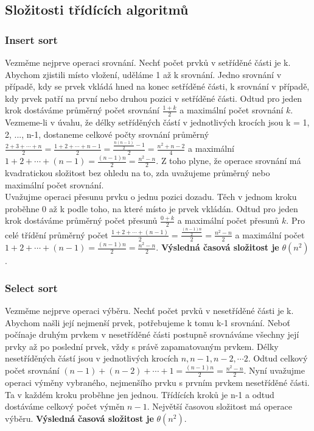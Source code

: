 \documentclass[10pt,a4paper]{article}
\begin{document}
\newpage
\subsection{Složitosti třídících algoritmů}
\subsubsection{Insert sort}
Vezměme nejprve operaci srovnání. Nechť počet prvků v setříděné části je k. Abychom zjistili místo vložení, uděláme 1 až k srovnání. Jedno srovnání v případě, kdy se prvek vkládá hned na konec setříděné části, k srovnání v případě, kdy prvek patří na první nebo druhou pozici v setříděné části. Odtud pro jeden krok dostáváme průměrný počet srovnání $\frac{1+k}{2}$ a maximální počet srovnání $k$. Vezmeme-li v úvahu, že délky setříděných částí v jednotlivých krocích jsou k = 1, 2, ..., n-1, dostaneme celkové počty srovnání průměrný $\frac{2+3+\cdots+n}{2} = \frac{1+2+\cdots+n-1}{2} = \frac{\frac{n(n-1)}{2}-1}{2} = \frac{n^2+n-2}{4}$ a maximální $1+2+\cdots+(n-1) = \frac{(n-1)n}{2} = \frac{n^2-n}{2}$. Z toho plyne, že operace srovnání má kvadratickou složitost bez ohledu na to, zda uvažujeme průměrný nebo maximální počet srovnání. \\
Uvažujme operaci přesunu prvku o jednu pozici dozadu. Těch v jednom kroku proběhne 0 až k podle toho, na které místo je prvek vkládán. Odtud pro jeden krok dostáváme průměrný počet přesunů $\frac{0+k}{2}$ a maximální počet přesunů $k$. Pro celé třídění průměrný počet $\frac{1+2+\cdots+(n-1)}{2} = \frac{\frac{(n-1)n}{2}}{2} = \frac{n^2-n}{2}$ a maximální počet $1+2+\cdots+(n-1) = \frac{(n-1)n}{2} = \frac{n^2-n}{2}$. \textbf{Výsledná časová složitost je} $\theta (n^2)$.

\subsubsection{Select sort}
Vezměme nejprve operaci výběru. Nechť počet prvků v nesetříděné části je k. Abychom našli její nejmenší prvek, potřebujeme k tomu k-1 srovnání. Neboť počínaje druhým prvkem v nesetříděné části postupně srovnáváme všechny její prvky až po poslední prvek, vždy s právě zapamatovaným prvkem. Délky nesetříděných částí jsou v jednotlivých krocích $n, n-1, n-2, \cdots 2$. Odtud celkový počet srovnání $(n-1) + (n-2) + \cdots + 1 = \frac{(n-1)n}{2} = \frac{n^2-n}{2}$. Nyní uvažujme operaci výměny vybraného, nejmenšího prvku s prvním prvkem nesetříděné části. Ta v každém kroku proběhne jen jednou. Třídících kroků je n-1 a odtud dostáváme celkový počet výměn $n-1$. Největší časovou složitost má operace výběru. \textbf{Výsledná časová složitost je} $\theta (n^2)$.
\end{document}

